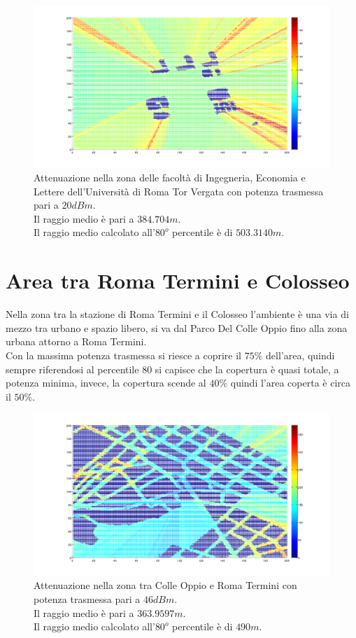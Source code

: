 \begin{figure}
\centering
\includegraphics[height=0.5\textwidth]{Immagini/TorVergataIng/attenuazione_femto}
\caption{Attenuazione nella zona delle facoltà di Ingegneria, Economia e Lettere dell'Università di Roma Tor Vergata con potenza
trasmessa pari a $20dBm$. \\
Il raggio medio è pari a $384.704 m$. \\
Il raggio medio calcolato all'$80^o$ percentile è di $503.3140 m$.}
\label{img:attingfemto}
\end{figure}

\newpage
\section{Area tra Roma Termini e Colosseo}
Nella zona tra la stazione di Roma Termini e il Colosseo l'ambiente è una via di mezzo tra urbano e spazio libero, si va dal Parco Del
Colle Oppio fino alla zona urbana attorno a Roma Termini. \\
Con la massima potenza trasmessa si riesce a coprire il $75\%$ dell'area, quindi sempre riferendosi al percentile $80$ si capisce che la
copertura è quasi totale, a potenza minima, invece, la copertura scende al $40\%$ quindi l'area coperta è circa il $50\%$.

\begin{figure}[!h]
\centering
\includegraphics[height=0.5\textwidth]{Immagini/ColleOppio/attenuazione}
\caption{Attenuazione nella zona tra Colle Oppio e Roma Termini con potenza trasmessa pari a $46dBm$. \\
Il raggio medio è pari a $363.9597 m$.\\
Il raggio medio calcolato all'$80^o$ percentile è di $490 m$.}
\label{img:attcolleoppio}
\end{figure}


